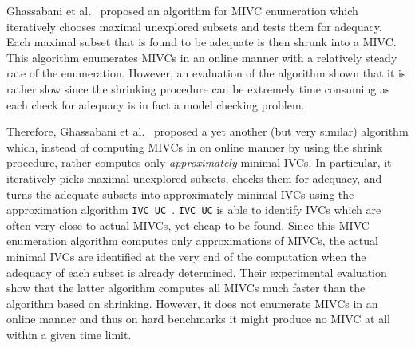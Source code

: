 Ghassabani et al.~\cite{Ghass17AllIVCs} proposed an algorithm for MIVC enumeration which iteratively chooses maximal unexplored subsets and tests them for adequacy. Each maximal subset that is found to be adequate is then shrunk into a MIVC. This algorithm enumerates MIVCs in an online manner with a relatively steady rate of the enumeration. However, an evaluation of the algorithm shown that it is rather slow since the shrinking procedure can be extremely time consuming as each check for adequacy is in fact a model checking problem.

Therefore, Ghassabani et al.~\cite{Ghass17AllIVCs} proposed a yet another (but very similar) algorithm which, instead of computing MIVCs in on online manner by using the shrink procedure, rather computes only \emph{approximately} minimal IVCs. In particular, it iteratively picks maximal unexplored subsets, checks them for adequacy, and turns the adequate subsets into approximately minimal IVCs using the approximation algorithm \texttt{IVC\_UC}~\cite{}. \texttt{IVC\_UC} is able to identify IVCs which are often very close to actual MIVCs, yet cheap to be found. Since this MIVC enumeration algorithm computes only approximations of MIVCs, the actual minimal IVCs  are identified at the very end of the computation when the adequacy of each subset is already determined.  Their experimental evaluation show that the latter algorithm computes all MIVCs much faster than the algorithm based on shrinking. However, it does not enumerate MIVCs in an online manner and thus on hard benchmarks it might produce no MIVC at all within a given time limit.


